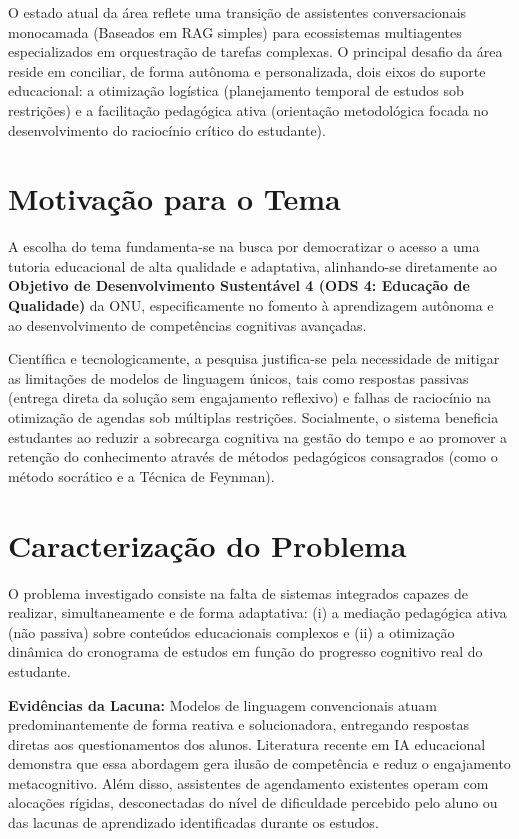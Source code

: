 \documentclass[12pt]{article}
\begin{document}
O estado atual da área reflete uma transição de assistentes conversacionais monocamada (Baseados em RAG simples) para ecossistemas multiagentes especializados em orquestração de tarefas complexas. O principal desafio da área reside em conciliar, de forma autônoma e personalizada, dois eixos do suporte educacional: a otimização logística (planejamento temporal de estudos sob restrições) e a facilitação pedagógica ativa (orientação metodológica focada no desenvolvimento do raciocínio crítico do estudante).

\section{Motivação para o Tema}
\label{sec:motivacao}
A escolha do tema fundamenta-se na busca por democratizar o acesso a uma tutoria educacional de alta qualidade e adaptativa, alinhando-se diretamente ao \textbf{Objetivo de Desenvolvimento Sustentável 4 (ODS 4: Educação de Qualidade)} da ONU, especificamente no fomento à aprendizagem autônoma e ao desenvolvimento de competências cognitivas avançadas.

Científica e tecnologicamente, a pesquisa justifica-se pela necessidade de mitigar as limitações de modelos de linguagem únicos, tais como respostas passivas (entrega direta da solução sem engajamento reflexivo) e falhas de raciocínio na otimização de agendas sob múltiplas restrições. Socialmente, o sistema beneficia estudantes ao reduzir a sobrecarga cognitiva na gestão do tempo e ao promover a retenção do conhecimento através de métodos pedagógicos consagrados (como o método socrático e a Técnica de Feynman).

\section{Caracterização do Problema}
\label{sec:problema}
O problema investigado consiste na falta de sistemas integrados capazes de realizar, simultaneamente e de forma adaptativa: (i) a mediação pedagógica ativa (não passiva) sobre conteúdos educacionais complexos e (ii) a otimização dinâmica do cronograma de estudos em função do progresso cognitivo real do estudante.

\textbf{Evidências da Lacuna:}
Modelos de linguagem convencionais atuam predominantemente de forma reativa e solucionadora, entregando respostas diretas aos questionamentos dos alunos. Literatura recente em IA educacional demonstra que essa abordagem gera ilusão de competência e reduz o engajamento metacognitivo. Além disso, assistentes de agendamento existentes operam com alocações rígidas, desconectadas do nível de dificuldade percebido pelo aluno ou das lacunas de aprendizado identificadas durante os estudos.
\end{document}
